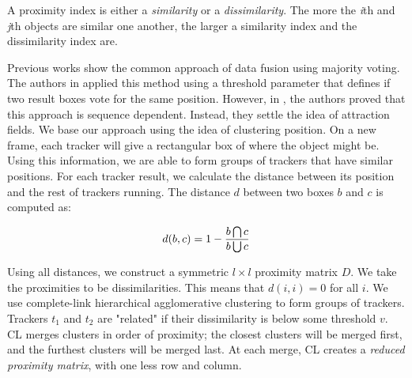 A proximity index is either a \textit{similarity} or a \textit{dissimilarity}. The more the \textit{i}th and \textit{j}th objects are similar one another, the larger a similarity index and the dissimilarity index are.

Previous works show the common approach of data fusion using majority voting. The authors in \cite{Bailer2013} applied this method using a threshold parameter that defines if two result boxes vote for the same position. However, in \cite{Bailer2014}, the authors proved that this approach is sequence dependent. Instead, they settle the idea of attraction fields. We base our approach using the idea of clustering position. On a new frame, each tracker will give a rectangular box of where the object might be. Using this information, we are able to form groups of trackers that have similar positions. For each tracker result, we calculate the distance between its position and the rest of trackers running. The distance $d$ between two boxes $b$ and $c$ is computed as:

\begin{equation}
\large
d(b,c) = 1 - \frac{b\bigcap c}{b\bigcup  c}
\end{equation}

\noindent Using all distances, we construct a symmetric $l \times l$ proximity matrix $D$. We take the proximities to be dissimilarities. This means that $d(i,i) = 0$ for all $i$. We use complete-link hierarchical agglomerative clustering to form groups of trackers. Trackers $t_1$ and $t_2$ are "related" if their dissimilarity is below some threshold $v$. CL merges clusters in order of proximity; the closest clusters will be merged first, and the furthest clusters will be merged last. At each merge, CL creates a \textit{reduced proximity matrix}, with one less row and column.
